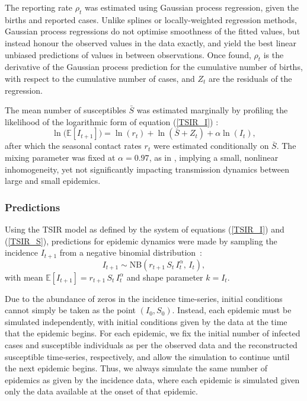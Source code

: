 \documentclass[10pt]{article}
\begin{document}
The reporting rate $\rho_t$ was estimated using Gaussian process regression, given the births and reported cases. Unlike splines or locally-weighted regression methods, Gaussian process regressions do not optimise smoothness of the fitted values, but instead honour the observed values in the data exactly, and yield the best linear unbiased predictions of values in between observations. Once found, $\rho_t$ is the derivative of the Gaussian process prediction for the cumulative number of births, with respect to the cumulative number of cases, and $Z_t$ are the residuals of the regression.

The mean number of susceptibles $\bar{S}$ was estimated marginally by profiling the likelihood of the logarithmic form of equation (\ref{TSIR_I}) :
\begin{equation}
\ln\big(\mathbb{E}\left[I_{t+1}\right]\big) = \ln(r_t) + \ln\left(\bar{S} + Z_t\right) + \alpha \ln\left(I_t\right),
\label{log}
\end{equation}
after which the seasonal contact rates $r_t$ were estimated conditionally on $\bar{S}$. The mixing parameter was fixed at $\alpha = 0.97$, as in \cite{Metcalf2010}, implying a small, nonlinear inhomogeneity, yet not significantly impacting transmission dynamics between large and small epidemics. 







\subsubsection*{Predictions}

Using the TSIR model as defined by the system of equations (\ref{TSIR_I}) and (\ref{TSIR_S}), predictions for epidemic dynamics were made by sampling the incidence $I_{t+1}$ from a negative binomial distribution~:
\begin{equation}
I_{t+1} \sim \mathrm{NB}\left(r_{t+1}\,S_t\,I_t^\alpha, \, I_t\right),
\end{equation}
with mean $\mathbb{E}\left[I_{t+1}\right] = r_{t+1} \, S_t \, I_t^\alpha$ and shape parameter $k = I_t$.

Due to the abundance of zeros in the incidence time-series, initial conditions cannot simply be taken as the point $\left(I_0, S_0\right)$. Instead, each epidemic must be simulated independently, with initial conditions given by the data at the time that the epidemic begins. For each epidemic, we fix the initial number of infected cases and susceptible individuals as per the observed data and the reconstructed susceptible time-series, respectively, and allow the simulation to continue until the next epidemic begins. Thus, we always simulate the same number of epidemics as given by the incidence data, where each epidemic is simulated given only the data available at the onset of that epidemic. 
\end{document}
